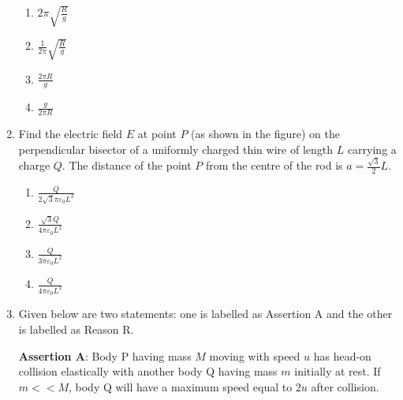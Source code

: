 \documentclass[journal]{IEEEtran}
\begin{document}
\begin{enumerate}
    \begin{multicols}{4}
    \begin{enumerate}
        \item $2\pi \sqrt{\frac{R}{g}}$
        \item $\frac{1}{2\pi} \sqrt{\frac{R}{g}}$
        \item $\frac{2\pi R}{g}$
        \item $\frac{g}{2\pi R}$
    \end{enumerate}
    \end{multicols}

    \item Find the electric field $E$ at point $P$ (as shown in the figure) on the
    perpendicular bisector of a uniformly charged thin wire of length $L$ carrying a
    charge $Q$. The distance of the point $P$ from the centre of the rod is
    $a = \frac{\sqrt{3}}{2}L$. 
     
    \begin{center}
    \end{center}

    \begin{multicols}{4}
    \begin{enumerate}
        \item $\frac{Q}{2\sqrt{3}\pi\varepsilon_0 L^2}$
        \item $\frac{\sqrt{3}Q}{4\pi\varepsilon_0 L^2}$
        \item $\frac{Q}{3\pi\varepsilon_0 L^2}$
        \item $\frac{Q}{4\pi\varepsilon_0 L^2}$
    \end{enumerate}
    \end{multicols}

    \item Given below are two statements: one is labelled as Assertion A and the
    other is labelled as Reason R.

    \textbf{Assertion A}: Body P having mass $M$ moving with speed $u$ has head-on
    collision elastically with another body Q having mass $m$ initially at rest.
    If $m << M$, body Q will have a maximum speed equal to $2u$ after collision.
    

\end{enumerate}
\end{document}
